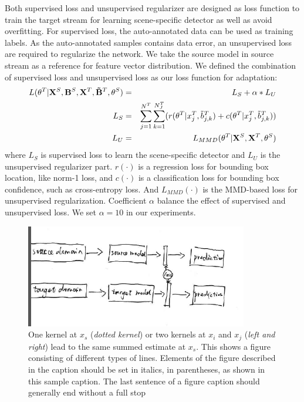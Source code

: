\documentclass[runningheads]{llncs}
\begin{document}
Both supervised loss and unsupervised regularizer are designed as loss function to train the target stream for learning scene-specific detector as well as avoid overfitting. For supervised loss, the auto-annotated data can be used as training labels. As the auto-annotated samples contains data error, an unsupervised loss are required to regularize the network. We take the source model in source stream as a reference for feature vector distribution. We defined the combination of supervised loss and unsupervised loss as our loss function for adaptation:
\begin{eqnarray}
  L(\theta^{T}|{\bf X}^{S},{\bf B}^{S},{\bf X}^{T},{\bf \tilde{B}}^{T},\theta^{S}) &=& L_{S} + \alpha * L_{U} \\
  L_{S} &=&  \sum^{N^{T}}_{j=1}{\sum^{N^{T}_{J}}_{k=1}( r(\theta^{T}|x^{T}_{j},\tilde{b}^{T}_{j,k})+c(\theta^{T}|x^{T}_{j},\tilde{b}^{T}_{j,k}) )} \\
  L_{U} &=& L_{MMD}(\theta^{T}|{\bf X}^{S},{\bf X}^{T},\theta^{S})
\end{eqnarray}
where $L_{S}$ is supervised loss to learn the scene-specific detector and $L_{U}$ is the unsupervised regularizer part. $r(\cdot)$ is a regression loss for bounding box location, like norm-1 loss, and $c(\cdot)$ is a classification loss for bounding box confidence, such as cross-entropy loss. And $L_{MMD}(\cdot)$ is the MMD-based loss for unsupervised regularization. Coefficient $\alpha$ balance the effect of supervised and unsupervised loss. We set $\alpha = 10$ in our experiments.

\begin{figure}
\centering
\includegraphics[height=4.5cm]{images/streams.png}
\caption{One kernel at $x_s$ ({\it dotted kernel}) or two kernels at
$x_i$ and $x_j$ ({\it left and right}) lead to the same summed estimate
at $x_s$. This shows a figure consisting of different types of
lines. Elements of the figure described in the caption should be set in
italics,
in parentheses, as shown in this sample caption. The last
sentence of a figure caption should generally end without a full stop}
\label{fig:example}
\end{figure}
\end{document}
